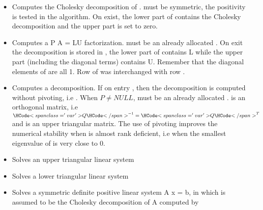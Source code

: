 \begin{itemize}
\item {}
  \sshortdescribe Computes the Cholesky decomposition of .  must
  be symmetric, the positivity is tested in the algorithm. On exist, the lower
  part of  contains the Cholesky decomposition and the upper part is
  set to zero.

\item {} 
  \sshortdescribe Computes a P A = LU factorization.  must be an
  already allocated  . On exit the decomposition is
  stored in , the lower part of  contains L while the upper part
  (including the diagonal terms) contains U. Remember that the diagonal
  elements of  are all 1. Row  of  was interchanged with
  row .
  
\item {} 
  \sshortdescribe Computes a  decomposition. If on entry
  , then the decomposition is computed without pivoting, i.e
  . When $P \ne NULL$,  must be an already allocated
  .  is an orthogonal matrix, i.e
  $\var{Q}^{-1} = \var{Q}^{T}$ and  is an upper triangular matrix. The
  use of pivoting improves the numerical stability when  is almost rank
  deficient, i.e when the smallest eigenvalue of  is very close to $0$.

\item {}
  \sshortdescribe Solves an upper triangular linear system 

\item {}
  \sshortdescribe Solves a lower triangular linear system  
  
\item {} 
  \sshortdescribe Solves a symmetric definite positive linear system A x = b, 
  in which  is assumed to be the Cholesky decomposition of A
  computed by 


\end{itemize}
